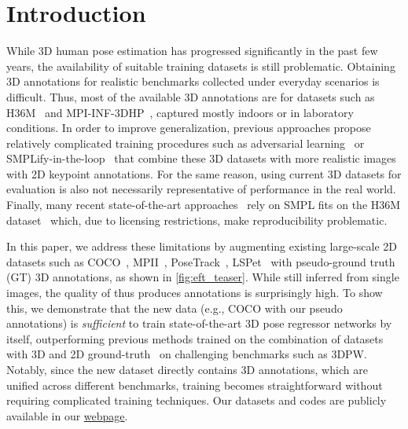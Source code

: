\documentclass[10pt,twocolumn,letterpaper]{article}
\begin{document}
\section{Introduction}\label{sec:intro}
	
While 3D human pose estimation has progressed significantly in the past few years, the availability of suitable training datasets is still problematic.
	Obtaining 3D annotations for realistic benchmarks collected under everyday scenarios is difficult.
	Thus, most of the available 3D annotations are for datasets such as H36M~\cite{h36m_pami, ionescu2011latent} and MPI-INF-3DHP~\cite{mehta2017monocular}, captured mostly indoors or in laboratory conditions.
	In order to improve generalization, previous approaches propose relatively complicated training procedures such as adversarial learning~\cite{kanazawa2018end, humanMotionKanazawa19} or SMPLify-in-the-loop~\cite{kolotouros2019spin} that combine these 3D datasets with more realistic images with 2D keypoint annotations.
	For the same reason, using current 3D datasets for evaluation is also not necessarily representative of performance in the real world.
	Finally, many recent state-of-the-art approaches~\cite{kanazawa2018end,humanMotionKanazawa19,kolotouros2019spin,kocabas2019vibe} rely on SMPL fits on the H36M dataset~\cite{h36m_pami, ionescu2011latent} which, due to licensing restrictions, make reproducibility problematic.
	
In this paper, we address these limitations by augmenting existing large-scale 2D datasets such as COCO~\cite{lin2014microsoft}, MPII~\cite{Andriluka-14},  PoseTrack~\cite{PoseTrack}, LSPet~\cite{Johnson11} with pseudo-ground truth (GT) 3D annotations, as shown in \cref{fig:eft_teaser}.
	While still inferred from single images, the quality of thus produces annotations is surprisingly high.
	To show this, we demonstrate that the new data (e.g., COCO with our pseudo annotations) is \emph{sufficient} to train state-of-the-art 3D pose regressor networks by itself, outperforming previous methods trained on the combination of datasets with 3D and 2D ground-truth~\cite{kanazawa2018end,sun2019human,kolotouros2019spin} on challenging benchmarks such as 3DPW\@.
Notably, since the new dataset directly contains 3D annotations, which are unified across different benchmarks, training becomes straightforward without requiring complicated training techniques.
Our datasets and codes are publicly available in our \href{https://github.com/facebookresearch/eft}{webpage}.
\end{document}
